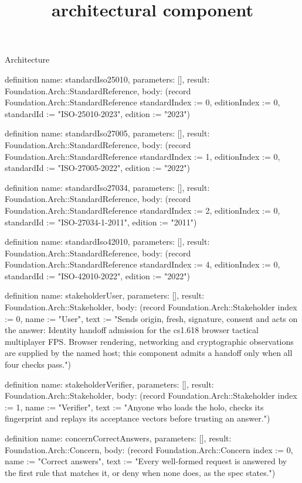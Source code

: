 \begin{lexlean}{Architecture}
\title{architectural component}
\begin{semanticmodule}
definition{
  name: standardIso25010,
  parameters: [],
  result: Foundation.Arch::StandardReference,
  body: (record Foundation.Arch::StandardReference {standardIndex := 0, editionIndex := 0, standardId := "ISO-25010-2023", edition := "2023"})
}

definition{
  name: standardIso27005,
  parameters: [],
  result: Foundation.Arch::StandardReference,
  body: (record Foundation.Arch::StandardReference {standardIndex := 1, editionIndex := 0, standardId := "ISO-27005-2022", edition := "2022"})
}

definition{
  name: standardIso27034,
  parameters: [],
  result: Foundation.Arch::StandardReference,
  body: (record Foundation.Arch::StandardReference {standardIndex := 2, editionIndex := 0, standardId := "ISO-27034-1-2011", edition := "2011"})
}

definition{
  name: standardIso42010,
  parameters: [],
  result: Foundation.Arch::StandardReference,
  body: (record Foundation.Arch::StandardReference {standardIndex := 4, editionIndex := 0, standardId := "ISO-42010-2022", edition := "2022"})
}

definition{
  name: stakeholderUser,
  parameters: [],
  result: Foundation.Arch::Stakeholder,
  body: (record Foundation.Arch::Stakeholder {index := 0, name := "User", text := "Sends origin, fresh, signature, consent and acts on the answer: Identity handoff admission for the cs1.618 browser tactical multiplayer FPS. Browser rendering, networking and cryptographic observations are supplied by the named host; this component admits a handoff only when all four checks pass."})
}

definition{
  name: stakeholderVerifier,
  parameters: [],
  result: Foundation.Arch::Stakeholder,
  body: (record Foundation.Arch::Stakeholder {index := 1, name := "Verifier", text := "Anyone who loads the holo, checks its fingerprint and replays its acceptance vectors before trusting an answer."})
}

definition{
  name: concernCorrectAnswers,
  parameters: [],
  result: Foundation.Arch::Concern,
  body: (record Foundation.Arch::Concern {index := 0, name := "Correct answers", text := "Every well-formed request is answered by the first rule that matches it, or deny when none does, as the spec states."})
}


\end{semanticmodule}
\end{lexlean}

